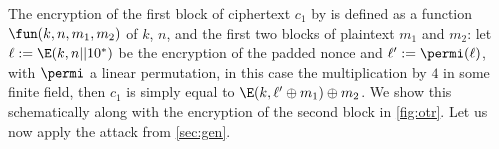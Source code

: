 The encryption of the first block of ciphertext $c_1$ by \proestotr is defined as a function
$\fun(k, n, m_1, m_2)$
of $k$, $n$, and the first two blocks of plaintext $m_1$ and $m_2$:
let $\ell := \E(k, n || 10^*)$ be the encryption of the padded nonce and
$\ell' := \permi(\ell)$, with $\permi$ a linear permutation, in this case the multiplication by $4$ in some finite field,
then $c_1$ is simply equal to $\E(k, \ell' \oplus m_1) \oplus m_2$. We show this schematically along with the encryption
of the second block in \autoref{fig:otr}.
Let us now apply the attack from \autoref{sec:gen}.

\begin{figure}[ht]
\begin{center}
\end{center}
\end{figure}
